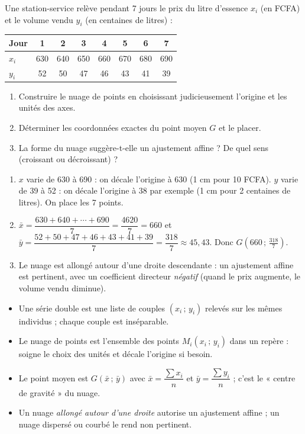 \documentclass[11pt]{article}
\newcommand{\cle}[1]{{\popxbold\color{popdark}#1}}
\begin{document}
\begin{exercice}
Une station-service relève pendant 7 jours le prix du litre d'essence $x_i$ (en FCFA) et le volume vendu $y_i$ (en centaines de litres) :
\begin{center}
\begin{tabular}{|l|c|c|c|c|c|c|c|}
\hline
\rowcolor{popblueL} Jour & 1 & 2 & 3 & 4 & 5 & 6 & 7 \\
\hline
$x_i$ & 630 & 640 & 650 & 660 & 670 & 680 & 690 \\
\hline
$y_i$ & 52 & 50 & 47 & 46 & 43 & 41 & 39 \\
\hline
\end{tabular}
\end{center}
\begin{enumerate}
\item Construire le nuage de points en choisissant judicieusement l'origine et les unités des axes.
\item Déterminer les coordonnées exactes du point moyen $G$ et le placer.
\item La forme du nuage suggère-t-elle un ajustement affine ? De quel sens (croissant ou décroissant) ?
\end{enumerate}
\end{exercice}

\begin{corrige}[Exercice]
\begin{enumerate}
\item $x$ varie de 630 à 690 : on décale l'origine à 630 (1 cm pour 10 FCFA). $y$ varie de 39 à 52 : on décale l'origine à 38 par exemple (1 cm pour 2 centaines de litres). On place les 7 points.
\item $\bar{x}=\dfrac{630+640+\cdots+690}{7}=\dfrac{4620}{7}=660$ et $\bar{y}=\dfrac{52+50+47+46+43+41+39}{7}=\dfrac{318}{7}\approx 45{,}43$. Donc $G(660\,;\,\frac{318}{7})$.
\item Le nuage est allongé autour d'une droite descendante : un ajustement affine est pertinent, avec un coefficient directeur \emph{négatif} (quand le prix augmente, le volume vendu diminue).
\end{enumerate}
\end{corrige}

\begin{aretenir}
\begin{itemize}
\item Une \cle{série double} est une liste de couples $(x_i\,;\,y_i)$ relevés sur les mêmes individus ; chaque couple est inséparable.
\item Le \cle{nuage de points} est l'ensemble des points $M_i(x_i\,;\,y_i)$ dans un repère : soigne le choix des unités et décale l'origine si besoin.
\item Le \cle{point moyen} est $G(\bar{x}\,;\,\bar{y})$ avec $\bar{x}=\dfrac{\sum x_i}{n}$ et $\bar{y}=\dfrac{\sum y_i}{n}$ ; c'est le « centre de gravité » du nuage.
\item Un nuage \emph{allongé autour d'une droite} autorise un ajustement affine ; un nuage dispersé ou courbé le rend non pertinent.
\end{itemize}
\end{aretenir}
\end{document}
